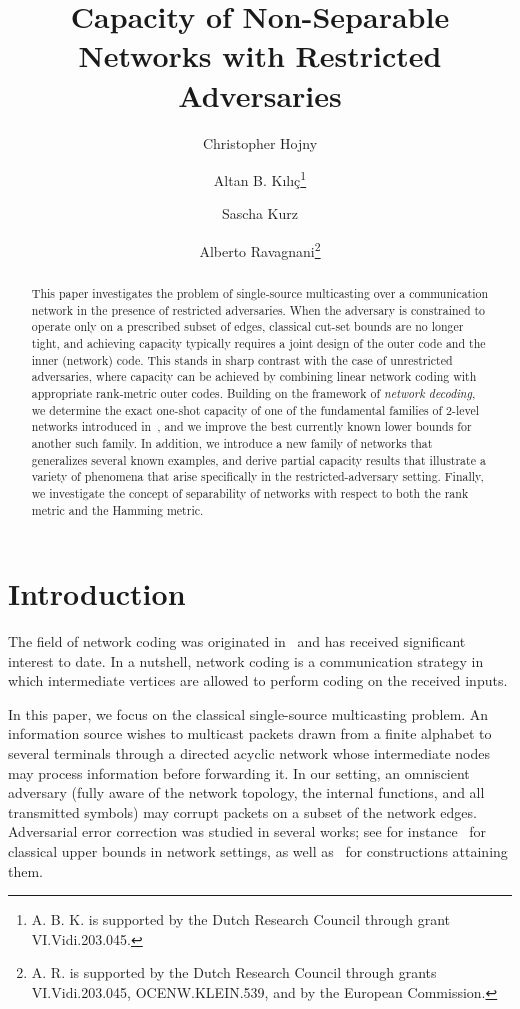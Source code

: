 \documentclass[11pt,a4paper]{article}
\title{\textbf{Capacity of Non-Separable Networks with Restricted Adversaries}}
\author[1]{Christopher Hojny}
\author[2]{Altan B. K\i l\i\c{c}\thanks{A. B. K. is supported by the Dutch Research Council through grant VI.Vidi.203.045.}}
\author[3]{Sascha Kurz}
\author[4]{Alberto Ravagnani\thanks{A. R. is supported by the Dutch Research Council through grants VI.Vidi.203.045, 
OCENW.KLEIN.539, and by the European Commission.}}
\affil[1,2,4]{
Eindhoven University of Technology, the Netherlands}
\affil[3]{University of Bayreuth, Germany}
\date{}
\theoremstyle{definition}
\begin{document}
\maketitle

\begin{abstract}
This paper investigates the problem of single-source multicasting over a communication network in the presence of restricted adversaries. When the adversary is constrained to operate only on a prescribed subset of edges, classical cut-set bounds are no longer tight, and achieving capacity
typically requires a joint design of the outer code and the inner (network) code. This stands in sharp contrast with the case of unrestricted adversaries, where capacity can be achieved by combining linear network coding with appropriate rank‑metric outer codes.
Building on the framework of \textit{network decoding}, we determine the exact one-shot capacity of one of the fundamental families of 2-level networks introduced in~\cite{beemer2023network}, and we improve the best currently known lower bounds for another such family. In addition, we introduce a new family of networks that generalizes several known examples, and derive partial capacity results that illustrate a variety of phenomena that arise specifically in the restricted-adversary setting. Finally, we investigate the concept of separability of networks with respect to both the rank metric and the Hamming metric. 
\end{abstract}

\medskip

\section{Introduction}

The field of network coding was originated in~\cite{ahlswede2000network,yeung2011network} and has received significant interest to date. In a nutshell, network coding is a communication strategy in which intermediate vertices are allowed to perform coding on the received inputs. 

In this paper, we focus on the classical single-source multicasting problem. An information source wishes to multicast packets drawn from a finite alphabet to several terminals through a directed acyclic network whose intermediate nodes may process information before forwarding it. In our setting, an omniscient adversary (fully aware of the network topology, the internal functions, and all transmitted symbols) may corrupt packets on a subset of the network edges. Adversarial error correction was studied in several works; see for instance~\cite{cai2006network,yeung2006network,yang2007refined} for classical upper bounds in network settings, as well as~\cite{matsumoto2007construction,yang2007construction} for constructions attaining them. 
\end{document}
